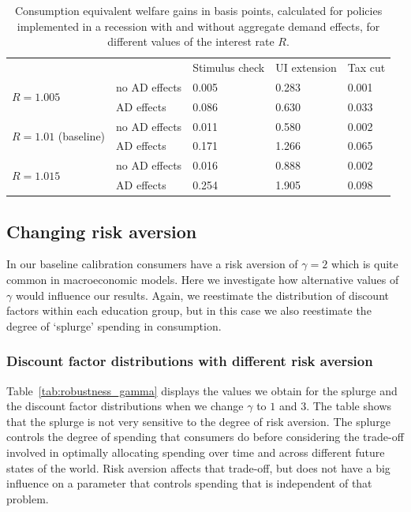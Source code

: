 \documentclass[../HAFiscal]{subfiles}
\begin{document}
\begin{table}[]
	\begin{center}
		\begin{tabular}{@{}lllll@{}}
			\toprule
			&                    & Stimulus check & UI extension & Tax cut \\ \cmidrule(l){1-5} 
			\multirow{2}{*}{$R = 1.005$}            	& no AD effects & 0.005        & 0.283       & 0.001\\
														& AD effects    & 0.086        & 0.630       & 0.033  \\
			\multirow{2}{*}{$R = 1.01$ (baseline)} 		& no AD effects & 0.011        & 0.580       & 0.002   \\
														& AD effects    & 0.171        & 1.266       & 0.065   \\
			\multirow{2}{*}{$R = 1.015$}            	& no AD effects & 0.016        & 0.888       & 0.002   \\
														& AD effects    & 0.254        & 1.905       & 0.098    \\ \cmidrule(l){1-5} 
		\end{tabular}
		\caption{Consumption equivalent welfare gains in basis points, calculated for policies implemented in a recession with and without aggregate demand effects, for different values of the interest rate $R$.}
		\label{tab:robustness_R_results}
	\end{center}
\end{table}


\FloatBarrier
\subsection{Changing risk aversion} 
\label{sec:robust_gamma} 

In our baseline calibration consumers have a risk aversion of $\gamma=2$ which is quite common in macroeconomic models. Here we investigate how alternative values of $\gamma$ would influence our results. Again, we reestimate the distribution of discount factors within each education group, but in this case we also reestimate the degree of `splurge' spending in consumption. 

\subsubsection{Discount factor distributions with different risk aversion}
\label{sec:robust_gamma_estim}

Table~\ref{tab:robustness_gamma} displays the values we obtain for the splurge and the discount factor distributions when we change $\gamma$ to $1$ and $3$. The table shows that the splurge is not very sensitive to the degree of risk aversion. The splurge controls the degree of spending that consumers do before considering the trade-off involved in optimally allocating spending over time and across different future states of the world. Risk aversion affects that trade-off, but does not have a big influence on a parameter that controls spending that is independent of that problem. 
\end{document}
